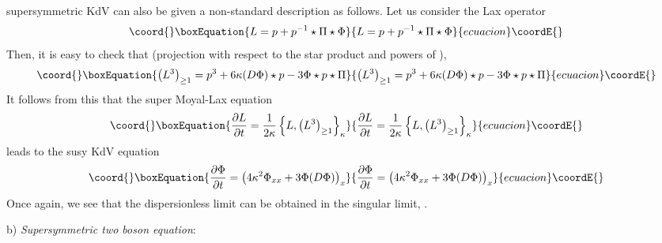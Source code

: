 \documentclass[a4paper,11pt]{article}
\begin{document}
\coordHE{} supersymmetric KdV can also be given a non-standard description
as follows. Let us consider the Lax operator
\begin{equation}\coord{}\boxEquation{
L = p + p^{-1}\star \Pi\star \Phi
}{
L = p + p^{-1}\star \Pi\star \Phi
}{ecuacion}\coordE{}\end{equation}
Then, it is easy to check that (projection with respect to the star
product and powers of \myHighlight{$\Pi$}\coordHE{}),
\begin{equation}\coord{}\boxEquation{
\left(L^{3}\right)_{\geq 1} = p^{3} + 6\kappa (D\Phi)\star p -
3\Phi\star p\star \Pi
}{
\left(L^{3}\right)_{\geq 1} = p^{3} + 6\kappa (D\Phi)\star p -
3\Phi\star p\star \Pi
}{ecuacion}\coordE{}\end{equation}
It follows from this that the super Moyal-Lax equation
\begin{equation}\coord{}\boxEquation{
{\partial L\over \partial t} = {1\over 2\kappa} \left\{L,
\left(L^{3}\right)_{\geq 1}\right\}_{\kappa}
}{
{\partial L\over \partial t} = {1\over 2\kappa} \left\{L,
\left(L^{3}\right)_{\geq 1}\right\}_{\kappa}
}{ecuacion}\coordE{}\end{equation}
leads to the \coordHE{} susy KdV equation
\begin{equation}\coord{}\boxEquation{
{\partial \Phi\over \partial t} = \left(4\kappa^{2} \Phi_{xx} + 3 \Phi
(D\Phi)\right)_{x}
}{
{\partial \Phi\over \partial t} = \left(4\kappa^{2} \Phi_{xx} + 3 \Phi
(D\Phi)\right)_{x}
}{ecuacion}\coordE{}\end{equation}
Once again, we see that the dispersionless limit can be obtained in
the singular limit, \coordHE{}.

b) {\it Supersymmetric two boson equation}:
\medskip
\end{document}
